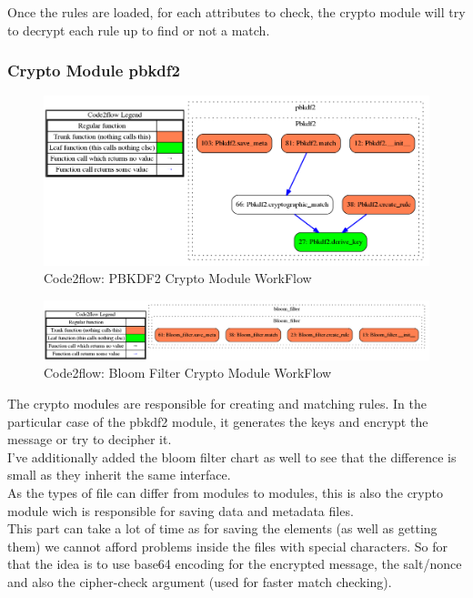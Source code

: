 \documentclass{eplmastersthesis}
\begin{document}
Once the rules are loaded, for each attributes to check, the crypto module will try to decrypt each rule up to find or not a match.

\subsubsection{Crypto Module \gls{pbkdf2}}

\begin{figure}[h!]
\begin{center}
	\includegraphics[scale=0.3]{res/flowPBKDF2}
	\caption{Code2flow: PBKDF2 Crypto Module WorkFlow}
	\label{code2flow-pbkdf2}
\end{center}
\end{figure}

\begin{figure}[h!]
\begin{center}
	\includegraphics[scale=0.3]{res/flowBloomFilter}
	\caption{Code2flow: Bloom Filter Crypto Module WorkFlow}
	\label{code2flow-bloom}
\end{center}
\end{figure}

The crypto modules are responsible for creating and matching rules. In the particular case of the \gls{pbkdf2} module, it generates the keys and encrypt the message or try to decipher it.\\
I've additionally added the bloom filter chart as well to see that the difference is small as they inherit the same interface.\\

As the types of file can differ from modules to modules, this is also the crypto module wich is responsible for saving data and metadata files.\\
This part can take a lot of time as for saving the elements (as well as getting them) we cannot afford problems inside the files with special characters. So for that the idea is to use base64 encoding for the encrypted message, the salt/nonce and also the cipher-check argument (used for faster match checking).\\
\end{document}
